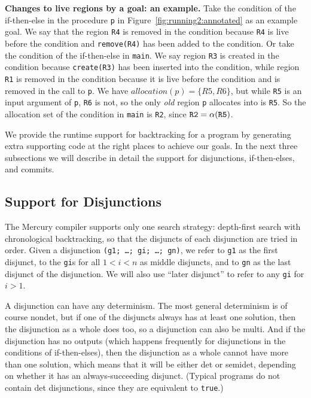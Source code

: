 \documentclass{tlp}
\newcommand{\allocation}[1]{\ensuremath{{allocation}(#1)}}
\newcommand{\code}[1]{{\tt#1}}
\begin{document}
\noindent\textbf{Changes to live regions by a goal: an example.}
Take the condition of the if-then-else in the procedure \code{p}
in Figure~\ref{fig:running2:annotated} as an example goal.
We say that the region \code{R4} is removed in the condition
because \code{R4} is live before the condition
and \code{remove(R4)} has been added to the condition.
Or take the condition of the if-then-else in \code{main}.
We say region \code{R3} is created in the condition
because \code{create(R3)} has been inserted into the condition,
while region \code{R1} is removed in the condition
because it is live before the condition
and is removed in the call to \code{p}.
We have $\allocation{p} = \{R5, R6\}$,
but while \code{R5} is an input argument of \code{p}, \code{R6} is not,
so the only \emph{old} region \code{p} allocates into is \code{R5}.
So the allocation set of the condition in \code{main} is \code{R2},
since ${\code{R2}} = \alpha{({\code{R5})}}$.

We provide the runtime support for backtracking for a program
by generating extra supporting code at the right places to achieve our goals.
In the next three subsections we will describe in detail
the support for disjunctions, if-then-elses, and commits.

\subsection{Support for Disjunctions}
\label{seCsupportnondetCdisjunction}

The Mercury compiler supports only one search strategy:
depth-first search with chronological backtracking,
so that the disjuncts of each disjunction are tried in order.
Given a disjunction \code{(g1; \ldots; gi; \ldots; gn)},
we refer to \code{g1} as the first disjunct,
to the \code{gi}s for all $1 < i < n$ as middle disjuncts,
and to \code{gn} as the last disjunct of the disjunction.
We will also use ``later disjunct'' to refer to any \code{gi} for $i > 1$.

A disjunction can have any determinism.
The most general determinism is of course nondet,
but if one of the disjuncts always has at least one solution,
then the disjunction as a whole does too,
so a disjunction can also be multi.
And if the disjunction has no outputs
(which happens frequently for disjunctions in the conditions of if-then-elses),
then the disjunction as a whole cannot have more than one solution,
which means that it will be either det or semidet,
depending on whether it has an always-succeeding disjunct.
(Typical programs do not contain det disjunctions,
since they are equivalent to \code{true}.)
\end{document}
